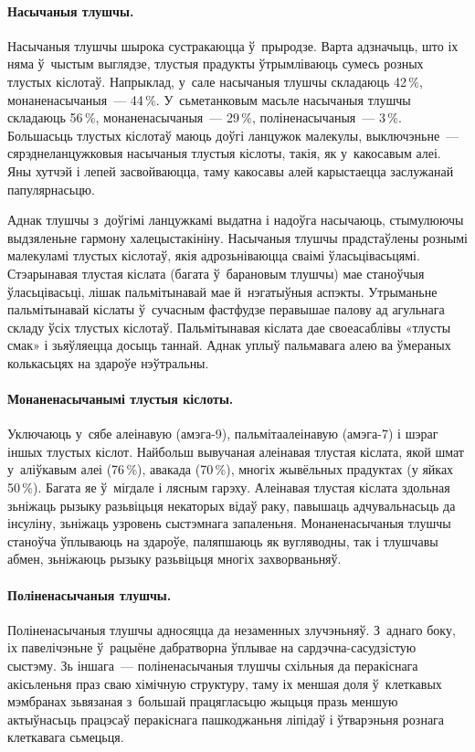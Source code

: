 \paragraph{Насычаныя тлушчы.}
Насычаныя тлушчы шырока сустракаюцца ў~прыродзе. Варта адзначыць, што іх няма ў~чыстым выглядзе, тлустыя прадукты ўтрымліваюць сумесь розных тлустых кіслотаў. Напрыклад, у~сале насычаныя тлушчы складаюць 42\,\%, монаненасычаныя~--- 44\,\%. У~сьметанковым масьле насычаныя тлушчы складаюць 56\,\%, монаненасычаныя~--- 29\,\%, поліненасычаныя~--- 3\,\%. Большасьць тлустых кіслотаў маюць доўгі ланцужок малекулы, выключэньне~--- сярэднеланцужковыя насычаныя тлустыя кіслоты, такія, як у~какосавым алеі. Яны хутчэй і лепей засвойваюцца, таму какосавы алей карыстаецца заслужанай папулярнасьцю.

Аднак тлушчы з~доўгімі ланцужкамі выдатна і надоўга насычаюць, стымулюючы выдзяленьне гармону халецыстакініну. Насычаныя тлушчы прадстаўлены рознымі малекуламі тлустых кіслотаў, якія адрозьніваюцца сваімі ўласьцівасьцямі. Стэарынавая тлустая кіслата (багата ў~барановым тлушчы) мае станоўчыя ўласьцівасьці, лішак пальмітынавай мае й~нэгатыўныя аспэкты. Утрыманьне пальмітынавай кіслаты ў~сучасным фастфудзе перавышае палову ад агульнага складу ўсіх тлустых кіслотаў. Пальмітынавая кіслата дае своеасаблівы «тлусты смак» і зьяўляецца досыць таннай. Аднак уплыў пальмавага алею ва ўмераных колькасьцях на здароўе нэўтральны.

\paragraph{Монаненасычанымі тлустыя кіслоты.}
Уключаюць у~сябе алеінавую (амэга-9), пальмітаалеінавую (амэга-7) і шэраг іншых тлустых кіслот. Найбольш вывучаная алеінавая тлустая кіслата, якой шмат у~аліўкавым алеі (76\,\%), авакада (70\,\%), многіх жывёльных прадуктах (у яйках 50\,\%). Багата яе ў~мігдале і лясным гарэху. Алеінавая тлустая кіслата здольная зьніжаць рызыку разьвіцьця некаторых відаў раку, павышаць адчувальнасьць да інсуліну, зьніжаць узровень сыстэмнага запаленьня. Монаненасычаныя тлушчы станоўча ўплываюць на здароўе, паляпшаюць як вугляводны, так і тлушчавы абмен, зьніжаюць рызыку разьвіцьця многіх захворваньняў.

\paragraph{Поліненасычаныя тлушчы.}
Поліненасычаныя тлушчы адносяцца да незаменных злучэньняў. З~аднаго боку, іх павелічэньне ў~рацыёне дабратворна ўплывае на сардэчна-сасудзістую сыстэму. Зь іншага~--- поліненасычаныя тлушчы схільныя да перакіснага акісьленьня праз сваю хімічную структуру, таму іх меншая доля ў~клеткавых мэмбранах зьвязаная з~большай працягласьцю жыцьця празь меншую актыўнасьць працэсаў перакіснага пашкоджаньня ліпідаў і ўтварэньня рознага клеткавага сьмецьця.

